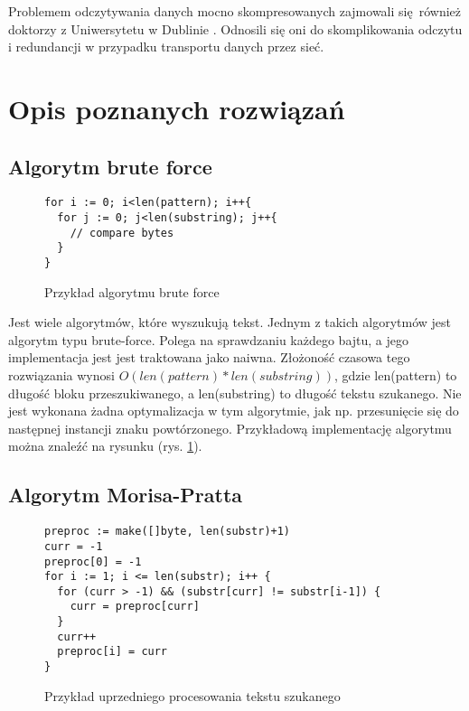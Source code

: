 Problemem odczytywania danych mocno skompresowanych zajmowali się również 
doktorzy z Uniwersytetu w Dublinie \cite{bib:internet:KompresjaDanych}. Odnosili
się oni do skomplikowania odczytu i redundancji w przypadku transportu danych
przez sieć.

\section{Opis poznanych rozwiązań}

\subsection{Algorytm brute force}

\begin{figure}[htbp]
  \centering
  \begin{lstlisting}
for i := 0; i<len(pattern); i++{
  for j := 0; j<len(substring); j++{
    // compare bytes
  }
}
  \end{lstlisting}
  \caption{Przykład algorytmu brute force}
  \label{fig:code:bruteForceComparison}
\end{figure}

Jest wiele algorytmów, które wyszukują tekst. Jednym z takich algorytmów jest 
algorytm typu brute-force. Polega na sprawdzaniu każdego bajtu, a jego implementacja
jest jest traktowana jako naiwna. Złożoność czasowa tego rozwiązania wynosi
$O(len(pattern) * len(substring))$, gdzie len(pattern) to długość bloku 
przeszukiwanego, a len(substring) to długość tekstu szukanego. Nie jest wykonana
żadna optymalizacja w tym algorytmie, jak np. przesunięcie się do następnej
 instancji znaku powtórzonego. Przykładową implementację algorytmu można znaleźć
  na rysunku (rys. \ref{fig:code:bruteForceComparison}).


\subsection{Algorytm Morisa-Pratta}

\begin{figure}[htbp]
  \centering
  \begin{lstlisting}
preproc := make([]byte, len(substr)+1)
curr = -1
preproc[0] = -1
for i := 1; i <= len(substr); i++ {
  for (curr > -1) && (substr[curr] != substr[i-1]) {
    curr = preproc[curr]
  }
  curr++
  preproc[i] = curr
}
  \end{lstlisting}
  \caption{Przykład uprzedniego procesowania tekstu szukanego}
  \label{fig:code:preprocessMorisPratt}
\end{figure}

